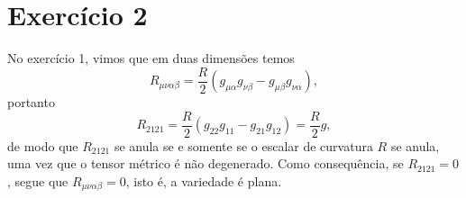 \section*{Exercício 2}
No exercício 1, vimos que em duas dimensões temos
\begin{equation*}
    R_{\mu\nu\alpha\beta} = \frac{R}{2}\left(g_{\mu\alpha}g_{\nu\beta} - g_{\mu\beta}g_{\nu\alpha}\right),
\end{equation*}
portanto
\begin{equation*}
    R_{2121} = \frac{R}{2}(g_{22}g_{11} - g_{21}g_{12}) = \frac{R}{2}g,
\end{equation*}
de modo que \(R_{2121}\) se anula se e somente se o escalar de curvatura \(R\) se anula, uma vez que o tensor métrico é não degenerado. Como consequência, se \(R_{2121} = 0\), segue que \(R_{\mu\nu\alpha\beta} = 0\), isto é, a variedade é plana.

